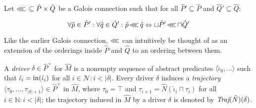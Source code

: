 



Let $\operatorname{\lll} \, \subseteq \hat P \times \hat Q$ be a Galois connection such that for all $\hat P' \subseteq \hat P$ and $\hat Q' \subseteq \hat Q$:

\begin{equation*}
\forall \hat p \in \hat P' : \forall \hat q \in \hat Q' : \hat p \operatorname{\lll} \hat q \Leftrightarrow \sqcup \hat P' \operatorname{\lll} \sqcap \hat Q'
\end{equation*}

\noindent Like the earlier Galois connection, $\operatorname{\lll}$ can intuitively be thought of as an extension of the orderings inside $\hat P$ and $\hat Q$ to an ordering between them.


A \textit{driver} $\delta \in \hat P^{+}$ for $\hat M$ is a nonempty sequence of abstract predicates $\langle \hat \iota_{0}, \ldots \rangle$ such that $\hat \iota_{i} = \operatorname{in}(\hat \iota_{i})$ for all $i \in \mathcal{N} : i < | \delta |$. Every driver $\delta$ induces a \textit{trajectory} $\langle \tau_{0}, \ldots, \tau_{| \delta | + 1} \rangle \in \hat P^{+}$ in $\hat M$, where $\tau_{0} = \top$ and $\tau_{i+1} = \hat N(\hat \iota_{i} \sqcap \tau_{i})$ for all $i \in \mathbb{N} : i < | \delta |$; the trajectory induced in $\hat M$ by a driver $\delta$ is denoted by $\textit{Traj}(\hat N)(\delta)$.

